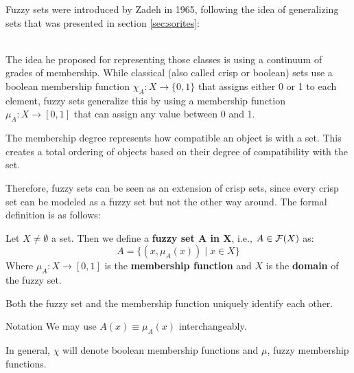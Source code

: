 Fuzzy sets were introduced by Zadeh in 1965, following the idea of generalizing sets that was presented in section \ref{sec:sorites}:

\cite{Zadeh1965}\\

The idea he proposed for representing those classes is using a continuum of grades of membership. While classical (also called crisp or boolean) sets use a boolean membership function $\chi_A:X\rightarrow\{0,1\}$ that assigns either 0 or 1 to each element, fuzzy sets generalize this by using a membership function $\mu_A:X\rightarrow[0,1]$ that can assign any value between 0 and 1. 

\begin{remark}
    The membership degree represents how compatible an object is with a set. This creates a total ordering of objects based on their degree of compatibility with the set.
\end{remark}

Therefore, fuzzy sets can be seen as an extension of crisp sets, since every crisp set can be modeled as a fuzzy set but not the other way around. The formal definition is as follows:

\begin{definition}
    Let $X\neq\emptyset$ a set. Then we define a \textbf{fuzzy set A in X}, i.e., $A \in \mathcal{F}(X)$ as:
    \[A=\{(x,\mu_A(x))\mid x\in X\}\]
    Where $\mu_A:X\longrightarrow [0,1]$ is the \textbf{membership function} and $X$ is the \textbf{domain} of the fuzzy set.
\end{definition}

\begin{remark}
     Both the fuzzy set and the membership function uniquely identify each other.
\end{remark}

\begin{notation}{Notation}
    We may use \( A(x) \equiv \mu_A(x) \) interchangeably.

    In general, $\chi$ will denote boolean membership functions and $\mu$, fuzzy membership functions.
\end{notation}



